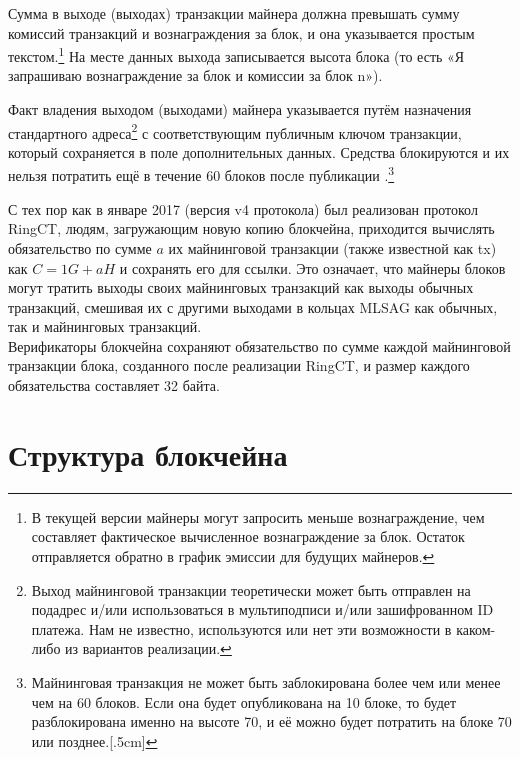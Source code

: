 Сумма в выходе (выходах) транзакции майнера должна превышать сумму комиссий транзак\-ций и вознаграждения за блок, и она указывается простым текстом.\footnote{В текущей версии майнеры могут запросить меньше вознаграждение, чем составляет фактическое вычисленное вознаграждение за блок. Остаток отправляется обратно в график эмиссии для будущих майнеров.} На месте данных выхода записывается высота блока (то есть «Я запрашиваю вознаграждение за блок и комис\-сии за блок n»).

Факт владения выходом (выходами) майнера указывается путём назначения стандартного адреса\footnote{Выход майнинговой транзакции теоретически может быть отправлен на подадрес и/или использоваться в мультиподписи и/или зашифрованном ID платежа. Нам не известно, используются или нет эти возможности в каком-либо из вариантов реализации.} с соответствующим публичным ключом транзакции, который сохраняется в поле дополнительных данных. Средства блокируются и их нельзя потратить ещё в течение 60 блоков после публикации \cite{transaction-lock}.\footnote{Майнинговая транзакция не может быть заблокирована более чем или менее чем на 60 блоков. Если она будет опубликована на 10 блоке, то будет разблокирована именно на высоте 70, и её можно будет потратить на блоке 70 или позднее.[.5cm]}%

С тех пор как в январе 2017 (версия v4 протокола) \cite{ringct-dates} был реализован протокол RingCT, людям, загружающим новую копию блокчейна, приходится вычислять обязательство по сумме $a$ их майнинговой транзакции (также известной как tx) как $C = 1G + aH$ и сохранять его для ссылки. Это означает, что майнеры блоков могут тратить выходы своих майнинговых транзакций как выходы обычных транзакций, смешивая их с другими выходами в кольцах MLSAG как обычных, так и майнинговых транзакций.\\

Верификаторы блокчейна сохраняют обязательство по сумме каждой майнинговой транзак\-ции блока, созданного после реализации RingCT, и размер каждого обязательства составляет 32 байта.



\section{Структура блокчейна}
\label{sec:blockchain-structure}

